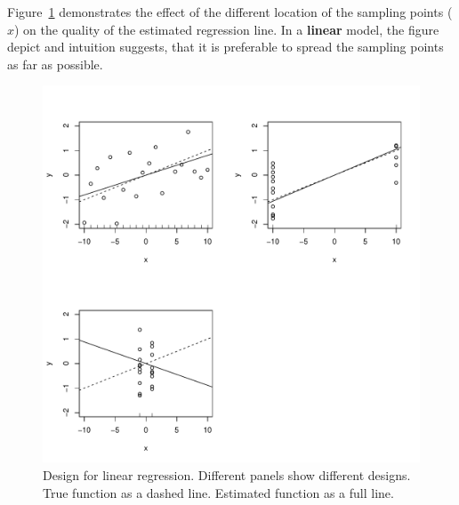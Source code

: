 \begin{example}
	\label{eg:design_linear}
	Figure~\ref{fig:design_linear} demonstrates the effect of the different location of the sampling points ($x$) on the quality of the estimated regression line.
	In a \textbf{linear} model, the figure depict and intuition suggests, that it is preferable to spread the sampling points as far as possible.
	\begin{figure}[h]
		\centering
		\includegraphics[height=0.3\textheight]{art/linear}
		\caption[Design for Linear Models]{
			Design for linear regression. Different panels show different designs. True function as a dashed line. Estimated function as a full line.}
		\label{fig:design_linear}
	\end{figure}
\end{example}





